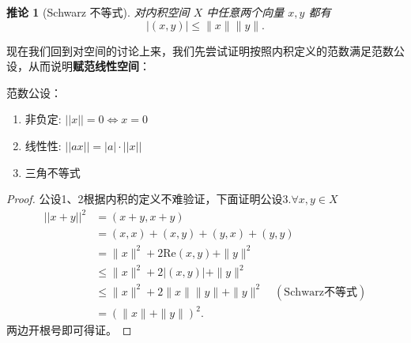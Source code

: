 \documentclass[12pt, a4paper, oneside, fontset=windows]{ctexbook}
\newtheorem{corollary}[theorem]{推论}
\begin{document}
    \begin{corollary}[Schwarz 不等式]
        对内积空间 $X$ 中任意两个向量 $x, y$ 都有
        \[
            |( x, y )| \le \|x\| \|y\|.
        \]
    \end{corollary}
    现在我们回到对空间的讨论上来，我们先尝试证明按照内积定义的范数满足范数公设，从而说明{\bf 赋范线性空间}：
    \begin{tcolorbox}
        范数公设：
        \begin{enumerate}
            \item 非负定: $||x||=0 \iff x=0$
            \item 线性性: $||ax||=|a|\cdot ||x||$
            \item 三角不等式
        \end{enumerate}
    \end{tcolorbox}
    \begin{proof}
        公设1、2根据内积的定义不难验证，下面证明公设3.$\forall x,y \in X$\\
        \begin{align*}
            ||x+y||^2 &= (x+y, x+y) \\
                        &= (x,x) + (x,y) + (y,x) + (y,y) \\
                        &= \|x\|^2 + 2\mathrm{Re}(x,y) + \|y\|^2 \\
                        &\le \|x\|^2 + 2|(x,y)| + \|y\|^2 \\
                        &\le \|x\|^2 + 2\|x\|\|y\| + \|y\|^2 \quad (\text{Schwarz不等式})\\
                        &= (\|x\|+\|y\|)^2.
        \end{align*}
        两边开根号即可得证。
    \end{proof}
\end{document}

